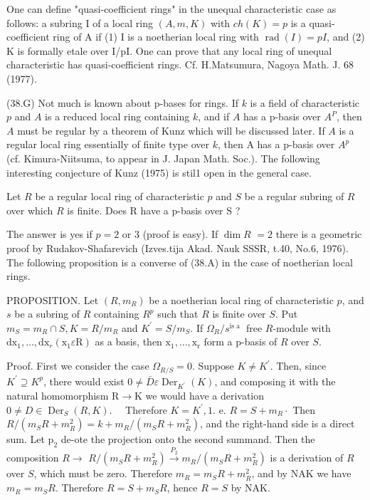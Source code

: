 One can define "quasi-coefficient rings" in the unequal characteristic case as follows: a subring I of a local ring $(A, m, K)$ with $c h(K)=p$ is a quasi-coefficient ring of A if (1) I is a noetherian local ring with $\operatorname{rad}(I)=p I$, and (2) $\mathrm{K}$ is formally etale over I/pI. One can prove that any local ring of unequal characteristic has quasi-coefficient rings. Cf. H.Matsumura, Nagoya Math. J. 68 (1977).

(38.G) Not much is known about p-bases for rings. If $k$ is a field of characteristic $p$ and $A$ is a reduced local ring containing $k$, and if $A$ has a p-basis over $A^{P}$, then $A$ must be regular by a theorem of Kunz which will be discussed later. If $A$ is a regular local ring essentially of finite type over $k$, then A has a p-basis over $A^{p}$ (cf. Kimura-Niitsuma, to appear in J. Japan Math. Soc.). The following interesting conjecture of Kunz (1975) is stil1 open in the general case.

Let $R$ be a regular local ring of characteristic $p$ and $S$ be a regular subring of $R$ over which $R$ is finite. Does $\mathrm{R}$ have a p-basis over $\mathrm{S}$ ?

The answer is yes if $p=2$ or 3 (proof is easy). If $\operatorname{dim} R$ $=2$ there is a geometric proof by Rudakov-Shafarevich (Izves.tija Akad. Nauk SSSR, t.40, No.6, 1976). The following proposition is a converse of (38.A) in the case of noetherian local rings.

PROPOSITION. Let $\left(R, m_{R}\right)$ be a noetherian local ring of characteristic $p$, and $s$ be a subring of $R$ containing $R^{p}$ such that $R$ is finite over $S$. Put $m_{S}=m_{R} \cap S, K=R / m_{R}$ and $K^{\prime}=S / m_{S}$. If $\Omega_{R} / s^{\text {is a }}$ free $R$-module with $\mathrm{dx}_{1}, \ldots, \mathrm{dx}{ }_{r}\left(\mathrm{x}_{1} \varepsilon \mathrm{R}\right)$ as a basis, then $\mathrm{x}_{1}, \ldots, \mathrm{x}_{\mathrm{r}}$ form a p-basis of $R$ over $S$.

Proof. First we consider the case $\Omega_{R / S}=0$. Suppose $K \neq K^{\prime}$. Then, since $K^{\prime} \supseteq K^{p}$, there would exist $0 \neq \bar{D} \varepsilon \operatorname{Der}_{K^{\prime}}(K)$, and composing it with the natural homomorphism $\mathrm{R} \rightarrow \mathrm{K}$ we would have a derivation $0 \neq D \in \operatorname{Der}_{S}(R, K) . \quad$ Therefore $K=K^{\prime}, 1 .$ e. $R=S+m_{R} \cdot$ Then $R /\left(m_{S} R+m_{R}^{2}\right)=k+m_{R} /\left(m_{S} R+m_{R}^{2}\right)$, and the right-hand side is a direct sum. Let $\mathrm{p}_{2}$ de-ote the projection onto the second summand. Then the composition $R \rightarrow$ $R /\left(m_{S} R+m_{R}^{2}\right) \stackrel{P_{2}}{\rightarrow} m_{R} /\left(m_{S} R+m_{R}^{2}\right)$ is a derivation of $R$ over $S$, which must be zero. Therefore $m_{R}=m_{S} R+m_{R}^{2}$, and by NAK we have $m_{R}=m_{S} R$. Therefore $R=S+m_{S} R$, hence $R=S$ by NAK.

